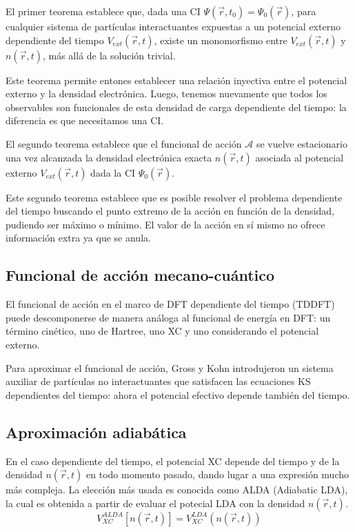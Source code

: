   El primer teorema establece que, dada una CI $\Psi (\vec{r},t_0) = \Psi_0 (\vec{r})$, para cualquier sistema de partículas interactuantes expuestas a un potencial externo dependiente del tiempo $V_{ext} (\vec{r}, t)$, existe un monomorfismo entre $V_{ext} (\vec{r}, t)$ y $n (\vec{r}, t)$, más allá de la solución trivial.

  Este teorema permite entones establecer una relación inyectiva entre el potencial externo y la densidad electrónica. Luego, tenemos nuevamente que todos los observables son funcionales de esta densidad de carga dependiente del tiempo: la diferencia es que necesitamos una CI.

  El segundo teorema establece que el funcional de acción $\mathcal{A}$ se vuelve estacionario una vez alcanzada la densidad electrónica exacta $n (\vec{r}, t)$ asociada al potencial externo $V_{ext} (\vec{r}, t)$ dada la CI $\Psi_0 (\vec{r})$.


  Este segundo teorema establece que es posible resolver el problema dependiente del tiempo buscando el punto extremo de la acción en función de la densidad, pudiendo ser máximo o mínimo. El valor de la acción en sí mismo no ofrece información extra ya que se anula.

\subsection{Funcional de acción mecano-cuántico}

  El funcional de acción en el marco de DFT dependiente del tiempo (TDDFT) puede descomponerse de manera análoga al funcional de energía en DFT: un término cinético, uno de Hartree, uno XC y uno considerando el potencial externo.

  Para aproximar el funcional de acción, Gross y Kohn introdujeron un sistema auxiliar de partículas no interactuantes que satisfacen las ecuaciones KS dependientes del tiempo: ahora el potencial efectivo depende también del tiempo.


\subsection{Aproximación adiabática}

  En el caso dependiente del tiempo, el potencial XC depende del tiempo y de la densidad $n (\vec{r}, t)$ en todo momento pasado, dando lugar a una expresión mucho más compleja. La elección más usada es conocida como ALDA (Adiabatic LDA), la cual es obtenida a partir de evaluar el potecial LDA con la densidad $n (\vec{r}, t)$.
    $$V_{XC}^{ALDA} [n (\vec{r}, t)] = V_{XC}^{LDA} \left(n (\vec{r}, t)\right)$$

